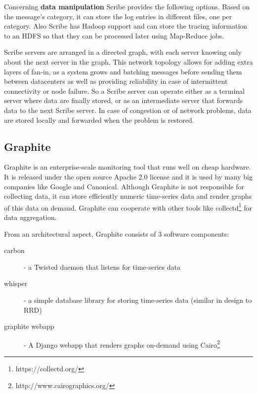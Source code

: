 Concerning \textbf{data manipulation} Scribe provides the following options.
Based on the message's category, it can store the log entries in different
files, one per category. Also Scribe has Hadoop support and can store the
tracing information to an HDFS so that they can be processed later using
Map-Reduce jobs.

Scribe servers are arranged in a directed graph, with each server
knowing only about the next server in the graph. This network topology allows
for adding extra layers of fan-in, as a system grows and batching messages
before sending them between datacenters as well as providing reliability in case
of intermittent connectivity or node failure. So a Scribe server can operate
either as a terminal server where data are finally stored, or as an intermediate
server that forwards data to the next Scribe server. In case of congestion or of
network problems, data are stored locally and forwarded when the problem is
restored.

\subsection{Graphite} 
Graphite is an enterprise-scale monitoring tool that runs well on cheap
hardware. It is released under the open source Apache 2.0 license and it is
used by many big companies like Google and Canonical. Although Graphite is not
responsible for collecting data, it can store efficiently numeric time-series
data and render graphs of this data on demand. Graphite can cooperate with other
tools like collectd\footnote{https://collectd.org/} for data aggregation.

From an architectural aspect, Graphite consists of 3 software components:

\begin{description}
\item[carbon] - a Twisted daemon that listens for time-series data
\item[whisper] - a simple database library for storing time-series data (similar
in design to RRD)
\item[graphite webapp] - A Django webapp that renders graphs on-demand using
Cairo\footnote{http://www.cairographics.org/}
\end{description}

